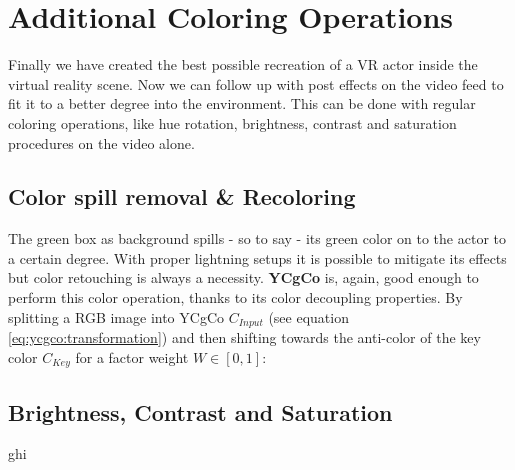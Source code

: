 %
\section{Additional Coloring Operations}

Finally we have created the best possible recreation of a VR actor inside the 
virtual reality scene. Now we can follow up with post effects on the video feed 
to fit it to a better degree into the environment. This can be done with 
regular coloring operations, like hue rotation, brightness, contrast and 
saturation procedures on the video alone.

\subsection{Color spill removal \& Recoloring}

The green box as background spills - so to say - its green color on to the 
actor to a certain degree. With proper lightning setups it is possible to 
mitigate its effects but color retouching is always a necessity. \textbf{YCgCo} 
is, again, good enough to perform this color operation, thanks to its color 
decoupling properties. By splitting a RGB image into YCgCo $C_{Input}$ (see 
equation \eqref{eq:ycgco:transformation}) and then shifting towards the 
anti-color of the key color $C_{Key}$ for a factor weight $W \in [0, 1]$:




\subsection{Brightness, Contrast and Saturation}

ghi